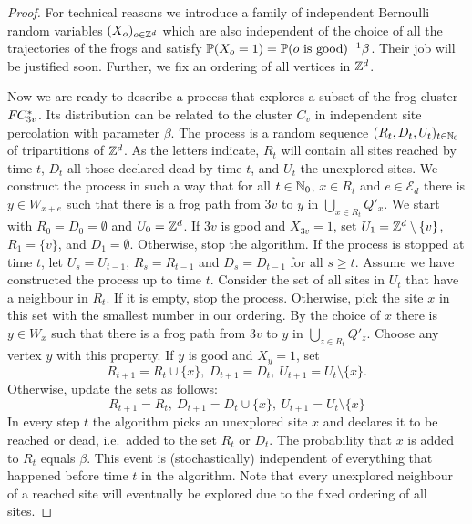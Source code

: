 \begin{proof}
For technical reasons we introduce a family of independent Bernoulli random variables $(X_o)_{o \in \Z^d}$ which are also independent of the choice of all the trajectories of the frogs and satisfy $\P(X_o=1) = \P(\text{$o$ is good})^{-1}\beta$. Their job will be justified soon. Further, we fix an ordering of all vertices in $\Z^d$.

Now we are ready to describe a process that explores a subset of the frog cluster $\fc_{3v}^*$. Its distribution can be related to the cluster $C_v$ in independent site percolation with parameter $\beta$. The process is a random sequence $(R_t, D_t, U_t)_{t\in \N_0}$ of tripartitions of $\Z^d$. As the letters indicate, $R_t$ will contain all sites reached by time $t$, $D_t$ all those declared dead by time $t$, and $U_t$ the unexplored sites. We construct the process in such a way that for all $t \in \N_0$, $x \in R_t$ and $e \in \mathcal{E}_d$ there is $y \in W_{x +e}$ such that there is a frog path from $3v$ to $y$ in $\bigcup_{x \in R_t}Q'_x$. We start with $R_0 = D_0 = \emptyset$ and $U_0 = \Z^d$. If $3v$ is good and $X_{3v}=1$, set $U_1 = \Z^d \setminus \{v\}$, $R_1=\{v\}$, and $D_1=\emptyset$. Otherwise, stop the algorithm. If the process is stopped at time $t$, let $U_s = U_{t-1}$, $R_s = R_{t-1}$ and $D_s = D_{t-1}$ for all $s \geq t$. Assume we have constructed the process up to time $t$. Consider the set of all sites in $U_t$ that have a neighbour in $R_t$. If it is empty, stop the process. Otherwise, pick the site $x$ in this set with the smallest number in our ordering. By the choice of $x$ there is $y \in W_x$ such that there is a frog path from $3v$ to $y$ in $\bigcup_{z \in R_t} Q'_z$. Choose any vertex $y$ with this property. If $y$ is good and $X_y = 1$, set 
\begin{equation*}
R_{t+1} = R_t \cup \{x\},\ D_{t+1} = D_t, \ U_{t+1}=U_t \setminus \{x\}. 
\end{equation*}
Otherwise, update the sets as follows:
\begin{equation*}
R_{t+1} = R_t,\ D_{t+1} = D_t \cup \{x\}, \ U_{t+1}=U_t \setminus \{x\}
\end{equation*}
In every step $t$ the algorithm picks an unexplored site $x$ and declares it to be reached or dead, i.e.~added to the set $R_{t}$ or $D_t$. The probability that $x$ is added to $R_t$ equals $\beta$. This event is (stochastically) independent of everything that happened before time $t$ in the algorithm. Note that every unexplored neighbour of a reached site will eventually be explored due to the fixed ordering of all sites.


\end{proof}
